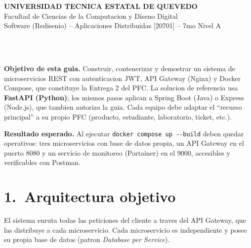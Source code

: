 \documentclass[11pt]{article}
\begin{document}
\begin{center}
{\LARGE\textbf{\textcolor{azulOscuro}{UNIVERSIDAD TECNICA ESTATAL DE QUEVEDO}}}\\[2pt]
{\large\textcolor{tealUteq}{Facultad de Ciencias de la Computacion y Diseno Digital}}\\[2pt]
{\normalsize\textcolor{azulMedio}{Software (Redisenio) -- Aplicaciones Distribuidas [20701] -- 7mo Nivel A}}\\[6pt]
\begin{tcolorbox}[colback=azulOscuro,colframe=azulOscuro,boxrule=0pt,arc=2pt,left=10pt,right=10pt,top=6pt,bottom=6pt,width=\textwidth]
\centering\textcolor{white}{\Large\textbf{Guia de resolucion paso a paso}}\\[2pt]
\textcolor{white}{GA-SUM-03 / PE-U2 -- Arquitectura, API y Contenerizacion del Sistema}
\end{tcolorbox}
\end{center}

\textbf{\textcolor{azulOscuro}{Objetivo de esta guia.}} Construir, contenerizar y demostrar un sistema de microservicios REST con autenticacion JWT, API Gateway (Nginx) y Docker Compose, que constituye la Entrega 2 del PFC. La solucion de referencia usa \textbf{FastAPI (Python)}; los mismos pasos aplican a Spring Boot (Java) o Express (Node.js), que tambien autoriza la guia. Cada equipo debe adaptar el ``recurso principal'' a su propio PFC (producto, estudiante, laboratorio, ticket, etc.).

\begin{nota}
\small \textbf{Resultado esperado.} Al ejecutar \texttt{docker compose up -{}-build} deben quedar operativos: tres microservicios con base de datos propia, un API Gateway en el puerto 8080 y un servicio de monitoreo (Portainer) en el 9000, accesibles y verificables con Postman.
\end{nota}

\section*{\textcolor{azulOscuro}{1.\ Arquitectura objetivo}}
El sistema enruta todas las peticiones del cliente a traves del API Gateway, que las distribuye a cada microservicio. Cada microservicio es independiente y posee su propia base de datos (patron \emph{Database per Service}).
\end{document}
